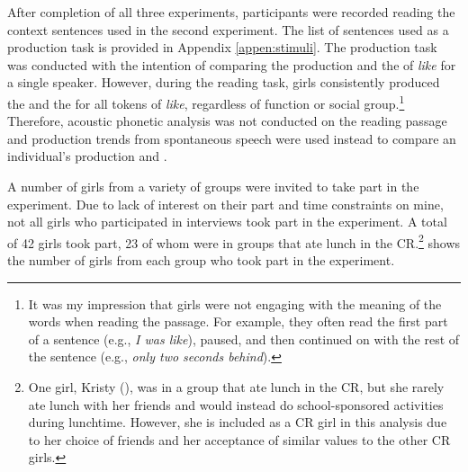 After completion of all three  experiments, participants were re\-cor\-ded reading the context sentences used in the second  experiment. The list of sentences used as a production task is provided in Appendix \ref{appen:stimuli}. The production task was conducted with the intention of comparing the production and the  of \textit{like} for a single speaker. However, during the reading task, girls consistently produced the  and the  for all tokens of \textit{like}, regardless of function or social group.\footnote{It was my impression that girls were not engaging with the meaning of the words when reading the passage. For example, they often read the first part of a sentence (e.g., \textit{I was like}), paused, and then continued on with the rest of the sentence (e.g., \textit{only two seconds behind}).} Therefore, acoustic phonetic analysis was not conducted on the reading passage and production trends from spontaneous speech were used instead to compare an individual's production and . 

A number of girls from a variety of groups were invited to take part in the experiment. Due to lack of interest on their part and time constraints on mine, not all girls who participated in interviews took part in the  experiment. A total of 42 girls took part, 23 of whom were in groups that ate lunch in the CR.\footnote{One girl, Kristy (), was in a group that ate lunch in the CR, but she rarely ate lunch with her friends and would instead do school-sponsored activities during lunchtime. However, she is included as a CR girl in this analysis due to her choice of friends and her acceptance of similar values to the other CR girls.}  shows the number of girls from each group who took part in the experiment.



